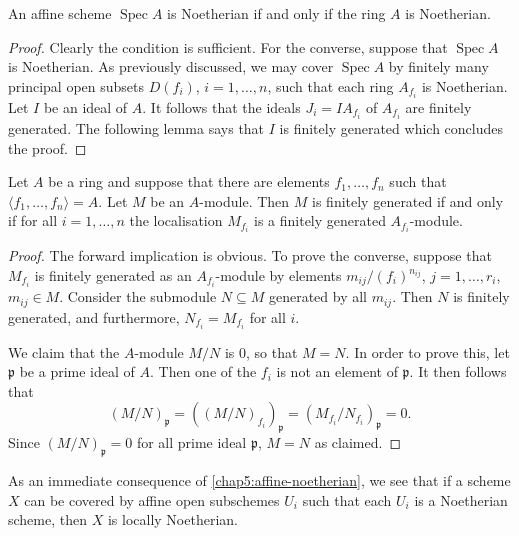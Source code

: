 \documentclass[12pt]{book}
\theoremstyle{definition}
\DeclareMathOperator{\Spec}{Spec}
\begin{document}
	\begin{lemma}\label{chap5:affine-noetherian}
		An affine scheme $\Spec A$ is Noetherian if and only if the ring $A$ is Noetherian.
	\end{lemma}
	\begin{proof}
		Clearly the condition is sufficient. For the converse, suppose that $\Spec A$ is Noetherian. As previously discussed, we may cover $\Spec A$ by finitely many principal open subsets $D(f_i)$, $i = 1, \dotsc, n$, such that each ring $A_{f_i}$ is Noetherian. Let $I$ be an ideal of $A$. It follows that the ideals $J_i = IA_{f_i}$ of $A_{f_i}$ are finitely generated. The following lemma says that $I$ is finitely generated which concludes the proof.
	\end{proof}
	
	\begin{lemma}
		Let $A$ be a ring and suppose that there are elements $f_1, \dotsc, f_n$ such that $\langle f_1, \dotsc, f_n\rangle = A$. Let $M$ be an $A$-module. Then $M$ is finitely generated if and only if for all $i = 1, \dotsc, n$ the localisation $M_{f_i}$ is a finitely generated $A_{f_i}$-module.
	\end{lemma}
	\begin{proof}
		The forward implication is obvious. To prove the converse, suppose that $M_{f_i}$ is finitely generated as an $A_{f_i}$-module by elements $m_{ij}/(f_i)^{n_{ij}}$, $j = 1, \dotsc, r_i$, $m_{ij} \in M$. Consider the submodule $N \subseteq M$ generated by all $m_{ij}$. Then $N$ is finitely generated, and furthermore, $N_{f_i} = M_{f_i}$ for all $i$. 
		
		We claim that the $A$-module $M/N$ is $0$, so that $M = N$. In order to prove this, let $\mathfrak{p}$ be a prime ideal of $A$. Then one of the $f_i$ is not an element of $\mathfrak{p}$. It then follows that
		\begin{equation*}
			(M/N)_{\mathfrak{p}} = ((M/N)_{f_i})_{\mathfrak{p}} = (M_{f_i}/N_{f_i})_{\mathfrak{p}} = 0.
		\end{equation*}
		Since $(M/N)_{\mathfrak{p}} = 0$ for all prime ideal $\mathfrak{p}$, $M = N$ as claimed.
	\end{proof}
	
	\begin{remark}\label{chap5:scheme-covered-by-Noetherian=affine-is-locally-Noetherian}
		As an immediate consequence of \cref{chap5:affine-noetherian}, we see that if a scheme $X$ can be covered by affine open subschemes $U_i$ such that each $U_i$ is a Noetherian scheme, then $X$ is locally Noetherian.
	\end{remark}
	
\end{document}
